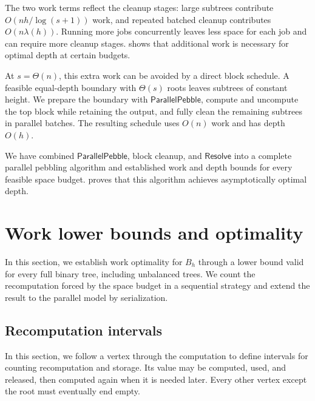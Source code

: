\documentclass[11pt]{article}
\theoremstyle{definition}
\theoremstyle{remark}
\newcommand{\Sweep}{\mathsf{ParallelPebble}}
\newcommand{\Resolve}{\mathsf{Resolve}}
\begin{document}
The two work terms reflect the cleanup stages: large subtrees contribute $O(nh/\log(s+1))$ work, and repeated batched cleanup contributes $O(n\lambda(h))$. Running more jobs concurrently leaves less space for each job and can require more cleanup stages.  shows that additional work is necessary for optimal depth at certain budgets.

At $s=\Theta(n)$, this extra work can be avoided by a direct block schedule. A feasible equal-depth boundary with $\Theta(s)$ roots leaves subtrees of constant height. We prepare the boundary with $\Sweep$, compute and uncompute the top block while retaining the output, and fully clean the remaining subtrees in parallel batches. The resulting schedule uses $O(n)$ work and has depth $O(h)$.

We have combined $\Sweep$, block cleanup, and $\Resolve$ into a complete parallel pebbling algorithm and established work and depth bounds for every feasible space budget.  proves that this algorithm achieves asymptotically optimal depth.



\section{Work lower bounds and optimality}
\label{sec:lower-bounds}

In this section, we establish work optimality for $B_h$ through a lower bound valid for every full binary tree, including unbalanced trees. We count the recomputation forced by the space budget in a sequential strategy and extend the result to the parallel model by serialization.


\subsection{Recomputation intervals}

In this section, we follow a vertex through the computation to define intervals for counting recomputation and storage. Its value may be computed, used, and released, then computed again when it is needed later. Every other vertex except the root must eventually end empty.
\end{document}

